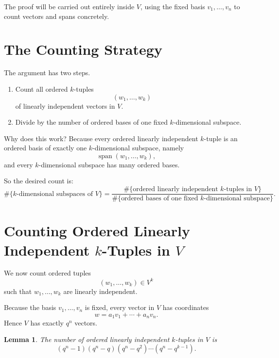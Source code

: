 \documentclass[11pt]{article}
\newtheorem{lemma}[theorem]{Lemma}
\theoremstyle{definition}
\theoremstyle{remark}
\newcommand{\Span}{\operatorname{span}}
\begin{document}
	The proof will be carried out entirely inside \(V\), using the fixed basis \(v_1,\dots,v_n\) to count vectors and spans concretely.
	
	\section{The Counting Strategy}
	
	The argument has two steps.
	
	\begin{enumerate}[label=\arabic*.]
		\item Count all ordered \(k\)-tuples
		\[
		(w_1,\dots,w_k)
		\]
		of linearly independent vectors in \(V\).
		\item Divide by the number of ordered bases of one fixed \(k\)-dimensional subspace.
	\end{enumerate}
	
	Why does this work? Because every ordered linearly independent \(k\)-tuple is an ordered basis of exactly one \(k\)-dimensional subspace, namely
	\[
	\Span(w_1,\dots,w_k),
	\]
	and every \(k\)-dimensional subspace has many ordered bases.
	
	So the desired count is:
	\[
	\#\{\text{\(k\)-dimensional subspaces of }V\}
	=
	\frac{\#\{\text{ordered linearly independent \(k\)-tuples in }V\}}
	{\#\{\text{ordered bases of one fixed \(k\)-dimensional subspace}\}}.
	\]
	
	\section{Counting Ordered Linearly Independent \(k\)-Tuples in \(V\)}
	
	We now count ordered tuples
	\[
	(w_1,\dots,w_k)\in V^k
	\]
	such that \(w_1,\dots,w_k\) are linearly independent.
	
	Because the basis \(v_1,\dots,v_n\) is fixed, every vector in \(V\) has coordinates
	\[
	w=a_1v_1+\cdots+a_nv_n.
	\]
	Hence \(V\) has exactly \(q^n\) vectors.
	
	\begin{lemma}
		The number of ordered linearly independent \(k\)-tuples in \(V\) is
		\[
		(q^n-1)(q^n-q)(q^n-q^2)\cdots(q^n-q^{k-1}).
		\]
	\end{lemma}
	
\end{document}

